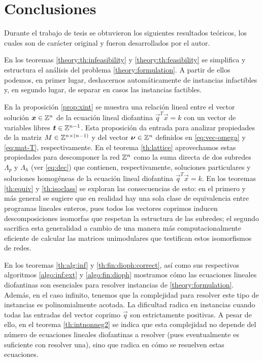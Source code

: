 \chapter{Conclusiones}
\noindent
Durante el trabajo de tesis se obtuvieron los siguientes resultados teóricos, los cuales son de
carácter original y fueron desarrollados por el autor.

En los teoremas \ref{theory:th:infeasibility} y \ref{theory:th:feasibility} se simplifica y
estructura el análisis del problema \eqref{theory:formulation}. A partir de ellos podemos, en primer
lugar, deshacernos automáticamente de instancias infactibles y, en segundo lugar, de separar en
casos las instancias factibles.

En la proposición \ref{prop:xint} se muestra una relación lineal entre el vector solución $\boldsymbol{x} \in
\mathbb{Z}^n$ de la ecuación lineal diofantina $\vec{q}^T\vec{x} = k$ con un vector de variables libres
$\boldsymbol{t} \in \mathbb{Z}^{n-1}$. Esta proposición da entrada para analizar propiedades de la matriz
$M \in \mathbb{Z}^{n \times (n - 1)}$ y del vector $\boldsymbol{\nu} \in \mathbb{Z}^n$ definidos en \eqref{eq:vec-omega} y
\eqref{eq:mat-T}, respectivamente. En el teorema \ref{th:lattice} aprovechamos estas propiedades
para descomponer la red $\mathbb{Z}^n$ como la suma directa de dos subredes $\Lambda_p$ y $\Lambda_h$ (ver
\eqref{eq:dec}) que contienen, respectivamente, soluciones particulares y soluciones homogéneas de
la ecuación lineal diofantina $\vec{q}^T\vec{x} = k$. En los teoremas \ref{th:equiv} y
\ref{th:isoclass} se exploran las consecuencias de esto: en el primero y más general se sugiere que en
realidad hay una sola clase de equivalencia entre programas lineales enteros, pues todos los
vectores coprimos inducen descomposiciones isomorfas que respetan la estructura de las subredes; el
segundo sacrifica esta generalidad a cambio de una manera más computacionalmente eficiente de
calcular las matrices unimodulares que testifican estos isomorfismos de redes.

En los teoremas \ref{th:alg:inf} y \ref{th:fin:dioph:correct}, así como sus respectivos algoritmos
\ref{algo:inf:ext} y \ref{algo:fin:dioph} mostramos cómo las ecuaciones lineales diofantinas son
esenciales para resolver instancias de \eqref{theory:formulation}. Además, en el caso infinito,
tenemos que la complejidad para resolver este tipo de instancias es polinomialmente acotada. La
dificultad radica en instancias cuando todas las entradas del vector coprimo $\vec{q}$ son
estrictamente positivas. A pesar de ello, en el teorema \ref{th:intnonneg2} se indica que esta complejidad
no depende del número de ecuaciones lineales diofantinas a resolver (pues eventualmente es
suficiente con resolver una), sino que radica en cómo se resuelven estas ecuaciones.

